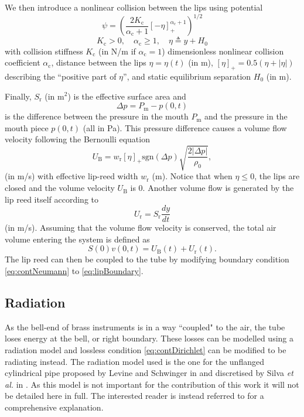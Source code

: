 We then introduce a nonlinear collision between the lips using potential
\begin{equation}
    \psi = \left(\frac{2K_\text{c}}{\alpha_\text{c}+1}[-\eta]_+^{\alpha_\text{c}+1}
    \right)^{1/2}
\end{equation}
\begin{equation*}
    K_\text{c}>0, \quad \alpha_\text{c}\geq 1, \quad \eta\triangleq y+H_0
\end{equation*}
with collision stiffness $K_\text{c}$ (in N/m if $\alpha_\text{c} = 1$) dimensionless nonlinear collision coefficient $\alpha_\text{c}$, distance between the lips $\eta = \eta(t)$ (in m), $[\eta]_+ = 0.5 (\eta + |\eta|)$ describing the ``positive part of $\eta$'',  and static equilibrium separation $H_0$ (in m).

Finally, $S_\text{r}$ (in m$^2$) is the effective surface area and 
\begin{equation}
    \Delta p = P_\text{m} - p(0,t)
\end{equation}
is the difference between the pressure in the mouth $P_\text{m}$ and the pressure in the mouth piece $p(0, t)$ (all in Pa). This pressure difference causes a volume flow velocity following the Bernoulli equation
\begin{equation}
    U_\text{B} = w_\text{r}[\eta]_+\text{sgn}(\Delta p) \sqrt{\frac{2|\Delta p|}{\rho_0}},
\end{equation}
(in m/s) with effective lip-reed width $w_\text{r}$ (m). Notice that when $\eta \leq 0$, the lips are closed and the volume velocity $U_\text{B}$ is 0. Another volume flow is generated by the lip reed itself according to
\begin{equation}
    U_\text{r} = S_\text{r} \frac{dy}{dt}
\end{equation}
(in m/s).
Assuming that the volume flow velocity is conserved, the total air volume entering the system is defined as
\begin{equation}\label{eq:lipBoundary}
    S(0)v(0,t) = U_\text{B}(t) + U_\text{r}(t).
\end{equation}
The lip reed can then be coupled to the tube by modifying boundary condition \eqref{eq:contNeumann} to \eqref{eq:lipBoundary}.



\subsection{Radiation}
As the bell-end of brass instruments is in a way ``coupled" to the air, the tube loses energy at the bell, or right boundary. These losses can be modelled using a radiation model and lossless condition \eqref{eq:contDirichlet} can be modified to be radiating instead. The radiation model used is the one for the unflanged cylindrical pipe proposed by Levine and Schwinger in \cite{Levine1948} and discretised by Silva \emph{et al.} in \cite{Silva2009}. As this model is not important for the contribution of this work it will not be detailed here in full. The interested reader is instead referred to \cite{Harrison2018} for a comprehensive explanation. 